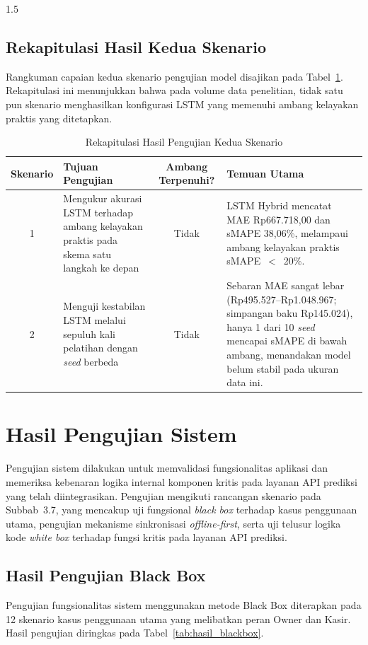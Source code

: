 \documentclass[12pt, a4paper, onecolumn, oneside]{report}
\begin{document}
\begin{spacing}{1.5}
\subsection{Rekapitulasi Hasil Kedua Skenario}
Rangkuman capaian kedua skenario pengujian model disajikan pada
Tabel~\ref{tab:rekap_skenario}. Rekapitulasi ini menunjukkan bahwa pada volume data
penelitian, tidak satu pun skenario menghasilkan konfigurasi LSTM yang memenuhi
ambang kelayakan praktis yang ditetapkan.
\begin{table}[H]
\centering
\caption{Rekapitulasi Hasil Pengujian Kedua Skenario}
\label{tab:rekap_skenario}
\begin{tabularx}{\textwidth}{|c|X|c|X|}
\hline
\textbf{Skenario} & \textbf{Tujuan Pengujian} & \textbf{Ambang Terpenuhi?} & \textbf{Temuan Utama} \\ \hline
1 & Mengukur akurasi LSTM terhadap ambang kelayakan praktis pada skema satu langkah ke depan
  & Tidak
  & LSTM Hybrid mencatat MAE Rp667.718,00 dan sMAPE 38,06\%, melampaui ambang
    kelayakan praktis sMAPE~$<$~20\%. \\ \hline
2 & Menguji kestabilan LSTM melalui sepuluh kali pelatihan dengan \textit{seed} berbeda
  & Tidak
  & Sebaran MAE sangat lebar (Rp495.527--Rp1.048.967; simpangan baku Rp145.024),
    hanya 1 dari 10 \textit{seed} mencapai sMAPE di bawah ambang, menandakan model
    belum stabil pada ukuran data ini. \\ \hline
\end{tabularx}
\end{table}

\section{Hasil Pengujian Sistem}
Pengujian sistem dilakukan untuk memvalidasi fungsionalitas aplikasi dan memeriksa kebenaran logika internal komponen kritis pada layanan API prediksi yang telah diintegrasikan. Pengujian mengikuti rancangan skenario pada Subbab~3.7, yang mencakup uji fungsional \textit{black box} terhadap kasus penggunaan utama, pengujian mekanisme sinkronisasi \textit{offline-first}, serta uji telusur logika kode \textit{white box} terhadap fungsi kritis pada layanan API prediksi.

\subsection{Hasil Pengujian Black Box}

Pengujian fungsionalitas sistem menggunakan metode Black Box diterapkan pada 12 skenario kasus penggunaan utama yang melibatkan peran Owner dan Kasir. Hasil pengujian diringkas pada Tabel~\ref{tab:hasil_blackbox}.


\end{spacing}
\end{document}
